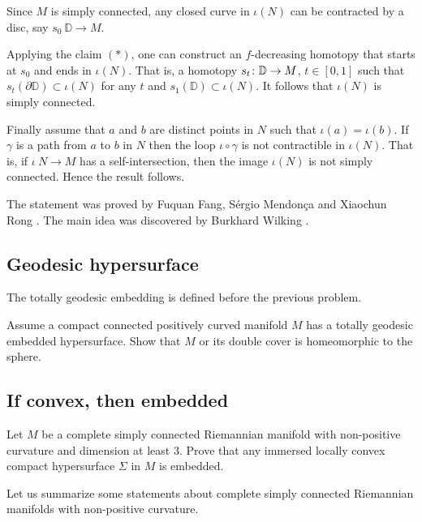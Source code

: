 Since $M$ is simply connected,
any closed curve in $\iota(N)$
can be contracted by a disc, say $s_0\:\mathbb D\to M$.

Applying the claim $({*})$, one can construct an $f$-decreasing homotopy that starts at $s_0$ and ends in $\iota(N)$.
That is,
a homotopy $s_t\:\mathbb D\z\to M$, $t\in [0,1]$ 
such that $s_t(\partial \mathbb D)\subset \iota(N)$ for any $t$ 
and $s_1(\mathbb D)\subset \iota(N)$.
It follows that $\iota(N)$ is simply connected.

Finally assume that $a$ and $b$ are distinct points in $N$ such that $\iota(a)=\iota(b)$.
If $\gamma$ is a path from $a$ to $b$ in $N$ then the loop $\iota\circ\gamma$ is not contractible in $\iota(N)$.
That is, if $\iota\:N\to M$ has a self-intersection,
then the image
$\iota(N)$ is not simply connected.
Hence the result follows.\qeds


The statement was proved by 
Fuquan Fang, 
S\'ergio Mendon\c{c}a 
and Xiaochun Rong \cite[see][]{FMR}.
The main idea was discovered by 
Burkhard Wilking \cite[see][]{wilking-2003}.

\subsection*{Geodesic hypersurface}
\label{Geodesic hypersurface}

The totally geodesic embedding is defined before the previous problem.

\begin{pr}
Assume a compact connected positively curved manifold $M$ has a totally geodesic embedded hypersurface.
Show that $M$ or its double cover is homeomorphic to the sphere.
\end{pr}

\subsection*{If convex, then embedded}
\label{If convex then embedded} 

\begin{pr}
Let $M$ be a complete simply connected Riemannian manifold 
with non-positive curvature 
and dimension at least $3$.
Prove that any immersed locally convex
compact hypersurface $\Sigma$ in $M$ is embedded.
\end{pr}

Let us summarize some statements about complete simply connected Riemannian manifolds 
with non-positive curvature.

